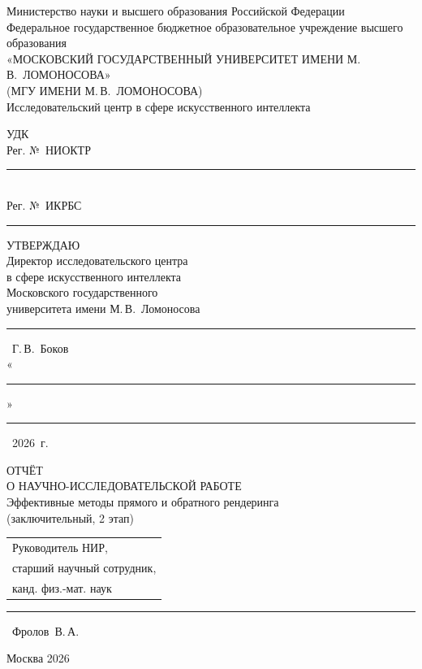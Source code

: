 \thispagestyle{empty}
\begin{SingleSpace}
\begin{center}
    Министерство науки и высшего образования Российской Федерации\\
    Федеральное государственное бюджетное образовательное учреждение высшего образования\\
    «МОСКОВСКИЙ ГОСУДАРСТВЕННЫЙ УНИВЕРСИТЕТ ИМЕНИ М.\,В.~ЛОМОНОСОВА»\\
    (МГУ ИМЕНИ М.\,В.~ЛОМОНОСОВА)\\[6pt]
    Исследовательский центр в сфере искусственного интеллекта
\end{center}

\vspace{12pt}
\noindent УДК\\
Рег. №~НИОКТР\rule{4.5cm}{0.4pt}\\
Рег. №~ИКРБС\rule{4.6cm}{0.4pt}

\vspace{12pt}
\hfill\begin{minipage}{0.5\textwidth}
    УТВЕРЖДАЮ\\
    Директор исследовательского центра\\
    в сфере искусственного интеллекта\\
    Московского государственного\\
    университета имени М.\,В.~Ломоносова\\[10pt]
    \rule{4cm}{0.4pt}~Г.\,В.~Боков\\[6pt]
    «\rule{1cm}{0.4pt}»\rule{3cm}{0.4pt}~2026~г.
\end{minipage}

\vfill
\begin{center}
    ОТЧЁТ\\
    О НАУЧНО-ИССЛЕДОВАТЕЛЬСКОЙ РАБОТЕ\\[12pt]
    Эффективные методы прямого и обратного рендеринга\\[12pt]
    (заключительный, 2 этап)
\end{center}

\vfill
\noindent\begin{tabular}{@{}l}
    Руководитель НИР,\\
    старший научный сотрудник,\\
    канд. физ.-мат. наук
\end{tabular}\hfill\rule{4cm}{0.4pt}~Фролов~В.\,А.

\vfill
\begin{center}
    Москва 2026
\end{center}
\end{SingleSpace}


